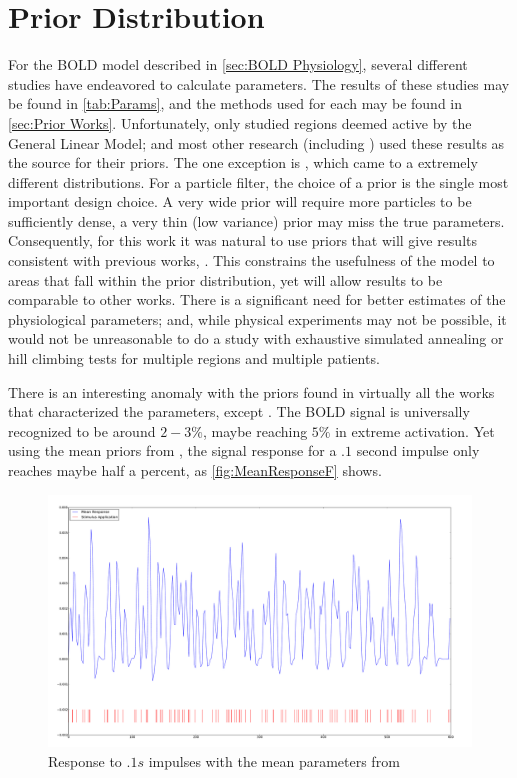 \section{Prior Distribution}
\label{sec:PriorDist}
For the BOLD model described in \autoref{sec:BOLD Physiology}, several
different studies have endeavored to calculate parameters. The results
of these studies may be found in \autoref{tab:Params}, and the methods 
used for each may be found in \autoref{sec:Prior Works}. Unfortunately,
\cite{Friston2000} only studied regions deemed active by the General 
Linear Model; and most other research (including \cite{Friston2001}) used these results as 
the source for their priors. 
The one exception is \cite{Johnston2008}, which came to a extremely different
distributions. For a particle filter, the choice of a prior is
the single most important design choice. A very wide prior will require
more particles to be sufficiently dense, a very thin (low variance) prior may miss
the true parameters. Consequently, for this work it was natural
to use priors that will give results consistent with previous works, 
\cite{Friston2000}. This constrains the usefulness of the model to
areas that fall within the prior distribution, yet will allow results
to be comparable to other works. There is a significant need for better
estimates of the physiological parameters; and, while physical experiments
may not be possible, it would not be unreasonable to do a study with
exhaustive simulated annealing or hill climbing tests for multiple
regions and multiple patients.

There is an interesting anomaly with the priors found in virtually all
the works that characterized the parameters, except \cite{Johnston2008}.
The BOLD signal is universally recognized to be around $2-3\%$, maybe
reaching $5\%$ in extreme activation. Yet using the mean priors
from \cite{Friston2000}, the signal response for a $.1$ second
impulse only reaches maybe half a percent, as \autoref{fig:MeanResponseF}
shows.

\begin{figure}
\centering
\label{fig:MeanResponseF}
\includegraphics[trim=6cm 3cm 6cm 3cm,width=16cm]{images/mean_response}
\caption{Response to $.1s$ impulses with the mean parameters from \cite{Friston2000}}
\end{figure}

